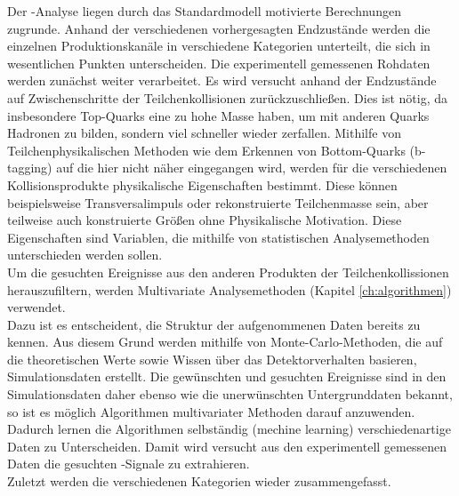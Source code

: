 Der \ttH-Analyse liegen durch das Standardmodell motivierte Berechnungen zugrunde. Anhand der verschiedenen vorhergesagten Endzust\"ande werden die einzelnen Produktionskan\"ale in verschiedene Kategorien unterteilt, die sich in wesentlichen Punkten unterscheiden. Die experimentell gemessenen Rohdaten werden zun\"achst weiter verarbeitet. Es wird versucht anhand der Endzust\"ande auf Zwischenschritte der Teilchenkollisionen zur\"uckzuschlie\ss en. Dies ist n\"otig, da insbesondere Top-Quarks eine zu hohe Masse  haben, um mit anderen Quarks Hadronen zu bilden, sondern viel schneller wieder zerfallen. Mithilfe von Teilchenphysikalischen Methoden wie dem Erkennen von Bottom-Quarks (b-tagging) auf die hier nicht n\"aher eingegangen wird, werden f\"ur die verschiedenen Kollisionsprodukte physikalische Eigenschaften bestimmt. Diese k\"onnen beispielsweise Transversalimpuls oder rekonstruierte Teilchenmasse sein, aber teilweise auch konstruierte Gr\"o\ss en ohne Physikalische Motivation. Diese Eigenschaften sind Variablen, die mithilfe von statistischen Analysemethoden unterschieden werden sollen.\\
Um die gesuchten Ereignisse aus den anderen Produkten der Teilchenkollissionen herauszufiltern, werden Multivariate Analysemethoden (Kapitel \ref{ch:algorithmen}) verwendet.\\
Dazu ist es entscheident, die Struktur der aufgenommenen Daten bereits zu kennen. Aus diesem Grund werden mithilfe von Monte-Carlo-Methoden, die auf die theoretischen Werte sowie Wissen \"uber das Detektorverhalten basieren, Simulationsdaten erstellt. Die gew\"unschten und gesuchten Ereignisse sind in den Simulationsdaten daher ebenso wie die unerw\"unschten Untergrunddaten bekannt, so ist es m\"oglich Algorithmen multivariater Methoden darauf anzuwenden. Dadurch lernen die Algorithmen selbst\"andig (mechine learning) verschiedenartige Daten zu Unterscheiden. Damit wird versucht aus den experimentell gemessenen Daten die gesuchten \ttH-Signale zu extrahieren.\\
Zuletzt werden die verschiedenen Kategorien wieder zusammengefasst.
